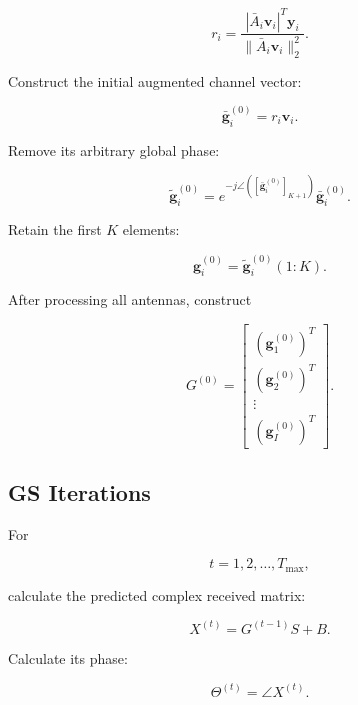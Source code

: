 \documentclass[12pt,a4paper]{article}
\begin{document}
\begin{equation}
\boxed{
r_i
=
\frac{
|\bar A_i\mathbf v_i|^T
\mathbf y_i
}{
\|\bar A_i\mathbf v_i\|_2^2
}
}.
\tag{354}
\end{equation}

Construct the initial augmented channel vector:

\begin{equation}
\boxed{
\bar{\mathbf g}_i^{(0)}
=
r_i\mathbf v_i
}.
\tag{355}
\end{equation}

Remove its arbitrary global phase:

\begin{equation}
\boxed{
\widetilde{\mathbf g}_i^{(0)}
=
e^{-j
\angle
([\bar{\mathbf g}_i^{(0)}]_{K+1})}
\bar{\mathbf g}_i^{(0)}
}.
\tag{356}
\end{equation}

Retain the first $K$ elements:

\begin{equation}
\boxed{
\mathbf g_i^{(0)}
=
\widetilde{\mathbf g}_i^{(0)}(1:K)
}.
\tag{357}
\end{equation}

After processing all antennas, construct

\begin{equation}
\boxed{
G^{(0)}
=
\begin{bmatrix}
(\mathbf g_1^{(0)})^T\\
(\mathbf g_2^{(0)})^T\\
\vdots\\
(\mathbf g_I^{(0)})^T
\end{bmatrix}
}.
\tag{358}
\end{equation}

\subsection{GS Iterations}

For

\begin{equation}
t=1,2,\ldots,T_{\max},
\tag{359}
\end{equation}

calculate the predicted complex received matrix:

\begin{equation}
\boxed{
X^{(t)}
=
G^{(t-1)}S+B
}.
\tag{360}
\end{equation}

Calculate its phase:

\begin{equation}
\boxed{
\Theta^{(t)}
=
\angle X^{(t)}
}.
\tag{361}
\end{equation}
\end{document}
